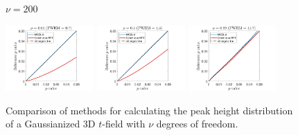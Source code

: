 \documentclass{article}
\begin{document}
\begin{figure}[!htp]
\begin{sideways}
\phantom{------------------}$\nu = 200$
\end{sideways}
\includegraphics[trim=70 5 100 5, clip,width=0.3\textwidth]{figure/3D_nu200_rho0.01_gauss.jpg}
\includegraphics[trim=70 5 100 5, clip,width=0.3\textwidth]{figure/3D_nu200_rho0.5_gauss.jpg}
\includegraphics[trim=70 5 100 5, clip,width=0.3\textwidth]{figure/3D_nu200_rho0.99_gauss.jpg}
\caption{Comparison of methods for calculating the peak height distribution of a Gaussianized 3D $t$-field with $\nu$ degrees of freedom.\label{fig.t2gauss3D}}
\end{figure}
\end{document}
